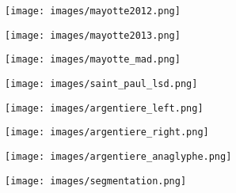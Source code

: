 \documentclass[8pt]{beamer}
\begin{document}
\vspace*{-6.5mm}
\begin{frame}[plain]
\hspace*{-11mm}
    \texttt{[image: images/mayotte2012.png]}
\end{frame}

\vspace*{-6.5mm}
\begin{frame}[plain]
\hspace*{-11mm}
    \texttt{[image: images/mayotte2013.png]}
\end{frame}

\vspace*{-6.5mm}
\begin{frame}[plain]
\hspace*{-11mm}
    \texttt{[image: images/mayotte\_mad.png]}
\end{frame}

\vspace*{-6.5mm}
\begin{frame}[plain]
\hspace*{-11mm}
\texttt{[image: images/saint\_paul\_lsd.png]}
\end{frame}

\vspace*{-6.5mm}
\begin{frame}[plain]
\hspace*{-11mm}
    \texttt{[image: images/argentiere\_left.png]}
\end{frame}

\vspace*{-6.5mm}
\begin{frame}[plain]
\hspace*{-11mm}
    \texttt{[image: images/argentiere\_right.png]}
\end{frame}

\vspace*{-6.5mm}
\begin{frame}[plain]
\hspace*{-11mm}
    \texttt{[image: images/argentiere\_anaglyphe.png]}
\end{frame}


\vspace*{-6.5mm}
\begin{frame}[plain]
\hspace*{-11mm}
    \texttt{[image: images/segmentation.png]}
\end{frame}
\end{document}

